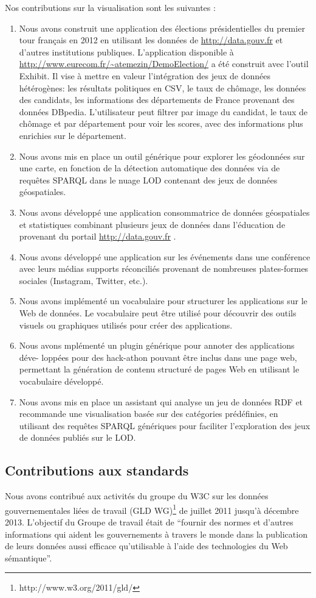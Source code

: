 \documentclass[a4paper,11pt,twoside]{report}
\begin{document}
Nos contributions sur la visualisation sont les suivantes :
\begin{enumerate}
 \item Nous avons construit une application des élections présidentielles du premier tour français en 2012 en utilisant les données de \url{http://data.gouv.fr} et d'autres institutions publiques. L'application disponible à \url{http://www.eurecom.fr/~atemezin/DemoElection/} a été construit avec l'outil Exhibit. Il vise à mettre en valeur l'intégration des jeux de données hétérogènes: les résultats politiques en CSV, le taux de chômage, les données des candidats, les informations des départements de France provenant des données DBpedia. L'utilisateur peut filtrer par image du candidat, le taux de chômage et par département pour voir les scores, avec des informations plus enrichies sur le département.
 \item Nous avons mis en place un outil générique pour explorer les géodonnées sur une carte, en fonction de la détection automatique des données via de requêtes SPARQL dans le nuage LOD contenant des jeux de données géospatiales.
 \item Nous avons développé une application consommatrice de données géospatiales et statistiques combinant plusieurs jeux de données dans l'éducation de provenant du portail \url{http://data.gouv.fr} .
 \item Nous avons développé une application sur les événements dans une conférence avec leurs médias supports réconciliés provenant de nombreuses plates-formes sociales (Instagram, Twitter, etc.).
 \item Nous avons implémenté un vocabulaire pour structurer les applications sur le Web de données. Le vocabulaire peut être utilisé pour découvrir des outils visuels ou graphiques utilisés pour créer des applications.
 \item Nous avons mplémenté un plugin générique pour annoter des applications déve- loppées pour des hack-athon pouvant être inclus dans une page web, permettant la génération de contenu structuré de pages Web en utilisant le vocabulaire développé.
 \item Nous avons mis en place un assistant qui analyse un jeu de données RDF et  recommande une visualisation basée sur des catégories prédéfinies, en utilisant des requêtes SPARQL génériques pour faciliter l'exploration des jeux de données publiés sur le LOD.
\end{enumerate}

\subsection*{Contributions aux standards}
\label{sec:contrib-standard}
Nous avons contribué aux activités du groupe du W3C sur les données gouvernementales liées de travail (GLD WG)\footnote{http://www.w3.org/2011/gld/} de juillet 2011 jusqu'à décembre 2013. L'objectif du Groupe de travail était de ``fournir des normes et d'autres informations qui aident les gouvernements à travers le monde dans la publication de leurs données aussi efficace qu'utilisable à l'aide des technologies du Web sémantique''.
\end{document}
